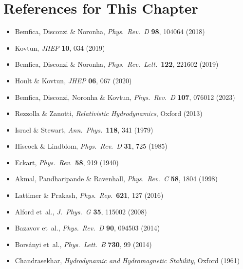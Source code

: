 \section*{References for This Chapter}

\begin{itemize}
  \item Bemfica, Disconzi \& Noronha, \textit{Phys.\ Rev.\ D}
    \textbf{98}, 104064 (2018) \citep{BemficaDN2018}
  \item Kovtun, \textit{JHEP} \textbf{10}, 034 (2019) \citep{Kovtun2019}
  \item Bemfica, Disconzi \& Noronha, \textit{Phys.\ Rev.\ Lett.}\
    \textbf{122}, 221602 (2019) \citep{BemficaDN2019}
  \item Hoult \& Kovtun, \textit{JHEP} \textbf{06}, 067 (2020)
    \citep{HoultKovtun2020}
  \item Bemfica, Disconzi, Noronha \& Kovtun, \textit{Phys.\ Rev.\ D}
    \textbf{107}, 076012 (2023) \citep{BemficaDNK2023}
  \item Rezzolla \& Zanotti, \textit{Relativistic Hydrodynamics},
    Oxford (2013) \citep{RezzollaZanotti2013}
  \item Israel \& Stewart, \textit{Ann.\ Phys.}\ \textbf{118}, 341
    (1979) \citep{IsraelStewart1979}
  \item Hiscock \& Lindblom, \textit{Phys.\ Rev.\ D} \textbf{31},
    725 (1985) \citep{HiscockLindblom1985}
  \item Eckart, \textit{Phys.\ Rev.}\ \textbf{58}, 919 (1940)
    \citep{Eckart1940}
  \item Akmal, Pandharipande \& Ravenhall, \textit{Phys.\ Rev.\ C}
    \textbf{58}, 1804 (1998) \citep{AkmalPR1998}
  \item Lattimer \& Prakash, \textit{Phys.\ Rep.}\ \textbf{621}, 127
    (2016) \citep{LattimerPrakash2016}
  \item Alford et~al., \textit{J.\ Phys.\ G} \textbf{35}, 115002
    (2008) \citep{AlfordEtAl2008}
  \item Bazavov et~al., \textit{Phys.\ Rev.\ D} \textbf{90}, 094503
    (2014) \citep{BazavovEtAl2014}
  \item Bors\'anyi et~al., \textit{Phys.\ Lett.\ B} \textbf{730}, 99
    (2014) \citep{BorsanyiEtAl2014}
  \item Chandrasekhar, \textit{Hydrodynamic and Hydromagnetic Stability},
    Oxford (1961) \citep{Chandrasekhar1961}

\end{itemize}

